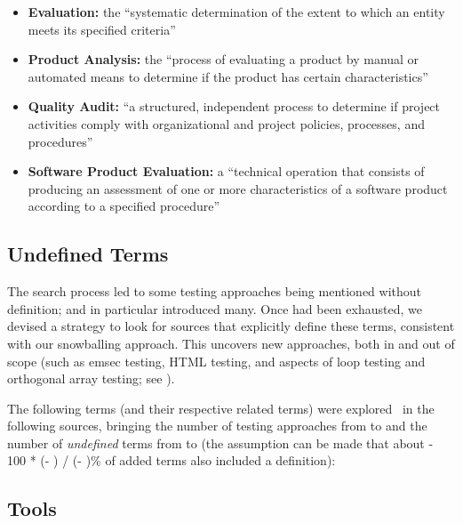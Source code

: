     \begin{itemize}
        \item \textbf{Evaluation:} the ``systematic determination of the extent
              to which an entity meets its specified criteria''
              \citep[p.~167]{IEEE2017}
        \item \textbf{Product Analysis:} the ``process of evaluating a product by
              manual or automated means to determine if the product has certain
              characteristics'' \citep[p.~343]{IEEE2017}
        \item \textbf{Quality Audit:} ``a structured, independent process to
              determine if project activities comply with organizational and
              project policies, processes, and procedures'' \citep[p.~361]{IEEE2017}
        \item \textbf{Software Product Evaluation:} a ``technical operation that
              consists of producing an assessment of one or more characteristics
              of a software product according to a specified procedure''
              \citep[p.~424]{IEEE2017}
    \end{itemize}
\fi
\subsection{Undefined Terms}
\label{undef-terms}

The search process led to some testing approaches being
mentioned without definition;
\citep{IEEE2022} and \citep{Firesmith2015} in particular introduced many.
Once \stds{} had been exhausted, we devised a strategy to
look for sources that explicitly define these terms, consistent with
our snowballing approach. This uncovers new approaches, both in and out of
scope (such as \acf{emsec} testing, HTML testing, and aspects of loop testing and
orthogonal array testing\ifnotpaper; see \fi).

The following terms (and their respective related terms) were explored%
\ifnotpaper\ in the following sources\fi, bringing the number of testing
approaches from \the\TotalBefore{} to \the\TotalAfter{} and the number of
\emph{undefined} terms from \the\UndefBefore{} to \the\UndefAfter{} (the
assumption can be made that about \the{} - 100 * (\UndefAfter -
\UndefBefore) / (\TotalAfter - \TotalBefore)\relax\% of added terms also
included a definition):



\ifnotpaper\else
    \subsection{Tools}  %
    \graphGenDesc{}
    \discrepClssTable{}
    \discrepCatsTable{}
\fi
